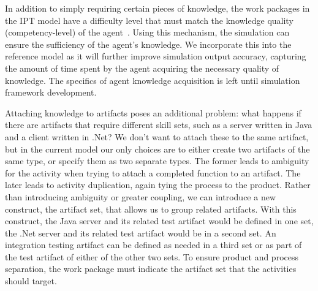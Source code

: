 In addition to simply requiring certain pieces of knowledge, the work packages
in the IPT model have a difficulty level that must match the
knowledge quality (competency-level) of the agent~\cite{crowder_development_2012}.
Using this mechanism, the simulation can ensure the sufficiency of the agent's
knowledge.  We incorporate this into the reference
model as it will further improve simulation output accuracy, capturing
the amount of time spent by the agent acquiring the necessary quality of
knowledge.  The specifics of agent knowledge acquisition is left until
simulation framework development.

Attaching knowledge to artifacts poses an additional problem: what happens if
there are artifacts that require different skill sets, such as a server written
in Java and a client written in .Net?  We don't want to attach these to the same
artifact, but in the current model our only choices are to either create two
artifacts of the same type, or specify them as two separate types.  The
former leads to ambiguity for the activity when trying to attach a completed
function to an artifact.  The later leads to activity duplication, again tying
the process to the product.  Rather than introducing ambiguity or greater coupling, we can
introduce a new construct, the artifact set, that allows us to group
related artifacts.  With this construct, the Java server and its related test
artifact would be defined in one set, the .Net server and its related test
artifact would be in a second set.  An integration testing artifact can be
defined as needed in a third set or as part of the test artifact of either of
the other two sets.  To ensure product and process separation, the work package
must indicate the artifact set that the activities should target.



